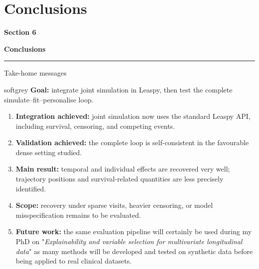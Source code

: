\documentclass{beamer}
\newcommand{\softbox}[2]{%
  \begin{beamercolorbox}[rounded=true,sep=0.8ex,wd=\linewidth]{#1}#2\end{beamercolorbox}}
\newcommand{\sectiondividercontent}[2]{%
  \centering
  \vfill
  {\color{CSgrey}\Large\bfseries Section #1}\par
  \vspace{0.8em}
  {\color{CSred}\Huge\bfseries #2}\par
  \vspace{0.8em}
  {\color{CSgrey}\rule{0.42\textwidth}{1.2pt}}\par
  \vfill
}
\begin{document}
\section{Conclusions}

\begin{frame}
  \sectiondividercontent{6}{Conclusions}
\end{frame}

\begin{frame}{Take-home messages}
  \softbox{softgrey}{
    \centering
    \textbf{Goal:} integrate joint simulation in Leaspy, then test the complete
    simulate--fit--personalise loop.
  }

  \vspace{0.6em}
  \small
  \begin{enumerate}
    \item \textbf{Integration achieved:} joint simulation now uses the standard Leaspy API,
      including survival, censoring, and competing events.
    \item \textbf{Validation achieved:} the complete loop is self-consistent in the favourable
      dense setting studied.
    \item \textbf{Main result:} temporal and individual effects are recovered very well;
      trajectory positions and survival-related quantities are less precisely identified.
    \item \textbf{Scope:} recovery under sparse visits, heavier censoring, or model
      misspecification remains to be evaluated.
    \item \textbf{Future work:} the same evaluation pipeline will certainly be used during my PhD on "\emph{Explainability and variable selection for multivariate longitudinal data}" as many methods will be developed and tested on synthetic data before being applied to real clinical datasets.
  \end{enumerate}

\end{frame}
\end{document}
